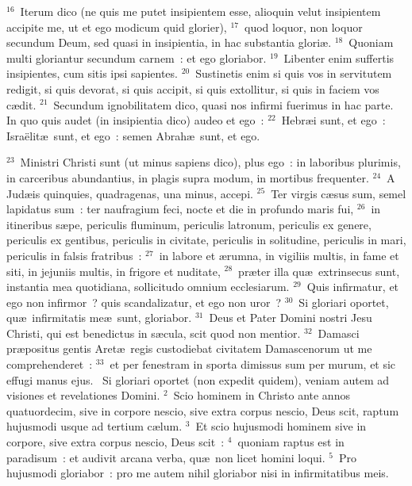 ${}^{16}$~Iterum dico (ne quis me putet insipientem esse, alioquin velut insipientem accipite me, ut et ego modicum quid glorier),
${}^{17}$~quod loquor, non loquor secundum Deum, sed quasi in insipientia, in hac substantia glori\ae .
${}^{18}$~Quoniam multi gloriantur secundum carnem~: et ego gloriabor.
${}^{19}$~Libenter enim suffertis insipientes, cum sitis ipsi sapientes.
${}^{20}$~Sustinetis enim si quis vos in servitutem redigit, si quis devorat, si quis accipit, si quis extollitur, si quis in faciem vos c\ae dit.
${}^{21}$~Secundum ignobilitatem dico, quasi nos infirmi fuerimus in hac parte. In quo quis audet (in insipientia dico) audeo et ego~:
${}^{22}$~Hebr\ae i sunt, et ego~: Isra\"elit\ae\ sunt, et ego~: semen Abrah\ae\ sunt, et ego.


${}^{23}$~Ministri Christi sunt (ut minus sapiens dico), plus ego~: in laboribus plurimis, in carceribus abundantius, in plagis supra modum, in mortibus frequenter.
${}^{24}$~A Jud\ae is quinquies, quadragenas, una minus, accepi.
${}^{25}$~Ter virgis c\ae sus sum, semel lapidatus sum~: ter naufragium feci, nocte et die in profundo maris fui,
${}^{26}$~in itineribus s\ae pe, periculis fluminum, periculis latronum, periculis ex genere, periculis ex gentibus, periculis in civitate, periculis in solitudine, periculis in mari, periculis in falsis fratribus~:
${}^{27}$~in labore et \ae rumna, in vigiliis multis, in fame et siti, in jejuniis multis, in frigore et nuditate,
${}^{28}$~pr\ae ter illa qu\ae\ extrinsecus sunt, instantia mea quotidiana, sollicitudo omnium ecclesiarum.
${}^{29}$~Quis infirmatur, et ego non infirmor~? quis scandalizatur, et ego non uror~?
${}^{30}$~Si gloriari oportet, qu\ae\ infirmitatis me\ae\ sunt, gloriabor.
${}^{31}$~Deus et Pater Domini nostri Jesu Christi, qui est benedictus in s\ae cula, scit quod non mentior.
${}^{32}$~Damasci pr\ae positus gentis Aret\ae\ regis custodiebat civitatem Damascenorum ut me comprehenderet~:
${}^{33}$~et per fenestram in sporta dimissus sum per murum, et sic effugi manus ejus.
~Si gloriari oportet (non expedit quidem), veniam autem ad visiones et revelationes Domini.
${}^{2}$~Scio hominem in Christo ante annos quatuordecim, sive in corpore nescio, sive extra corpus nescio, Deus scit, raptum hujusmodi usque ad tertium c\ae lum.
${}^{3}$~Et scio hujusmodi hominem sive in corpore, sive extra corpus nescio, Deus scit~:
${}^{4}$~quoniam raptus est in paradisum~: et audivit arcana verba, qu\ae\ non licet homini loqui.
${}^{5}$~Pro hujusmodi gloriabor~: pro me autem nihil gloriabor nisi in infirmitatibus meis.
